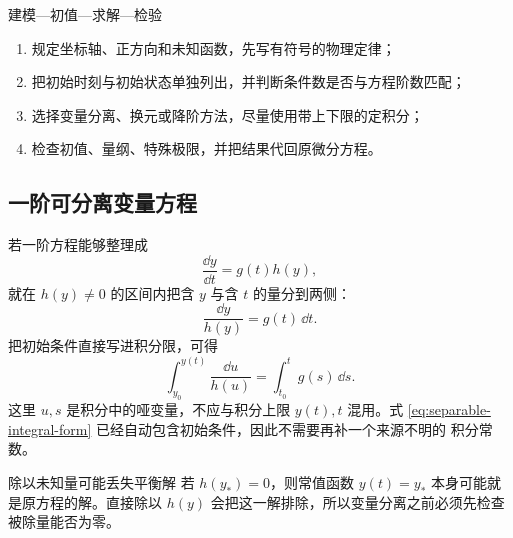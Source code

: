 \documentclass[UTF8,zihao=-4,oneside,openany]{ctexbook}
\begin{document}
\begin{methodbox}{建模—初值—求解—检验}
\begin{enumerate}[label=\arabic*.]
  \item 规定坐标轴、正方向和未知函数，先写有符号的物理定律；
  \item 把初始时刻与初始状态单独列出，并判断条件数是否与方程阶数匹配；
  \item 选择变量分离、换元或降阶方法，尽量使用带上下限的定积分；
  \item 检查初值、量纲、特殊极限，并把结果代回原微分方程。
\end{enumerate}
\end{methodbox}

\subsection{一阶可分离变量方程}

若一阶方程能够整理成
\begin{equation}
  \frac{\dd y}{\dd t}=g(t)h(y),
  \label{eq:separable-ode}
\end{equation}
就在 $h(y)\ne0$ 的区间内把含 $y$ 与含 $t$ 的量分到两侧：
\[
  \frac{\dd y}{h(y)}=g(t)\,\dd t.
\]
把初始条件直接写进积分限，可得
\begin{equation}
  \int_{y_0}^{y(t)}\frac{\dd u}{h(u)}
  =\int_{t_0}^{t}g(s)\,\dd s.
  \label{eq:separable-integral-form}
\end{equation}
这里 $u,s$ 是积分中的哑变量，不应与积分上限 $y(t),t$ 混用。式
\eqref{eq:separable-integral-form} 已经自动包含初始条件，因此不需要再补一个来源不明的
积分常数。

\begin{warningbox}{除以未知量可能丢失平衡解}
若 $h(y_*)=0$，则常值函数 $y(t)=y_*$ 本身可能就是原方程的解。直接除以 $h(y)$
会把这一解排除，所以变量分离之前必须先检查被除量能否为零。
\end{warningbox}
\end{document}
